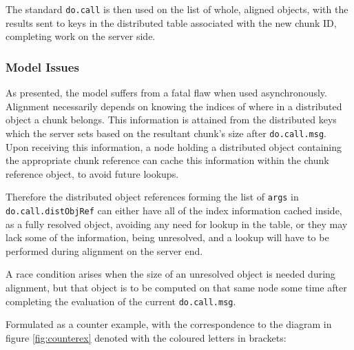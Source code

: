 The standard \texttt{do.call} is then used on the list of whole,
aligned objects, with the results sent to keys in the distributed table
associated with the new chunk ID, completing work on the server side.

\subsubsection{Model Issues}

As presented, the model suffers from a fatal flaw when used asynchronously.
Alignment necessarily depends on knowing the indices of where in a distributed
object a chunk belongs.
This information is attained from the distributed keys which the server sets
based on the resultant chunk's size after \texttt{do.call.msg}.
Upon receiving this information, a node holding a distributed object containing
the appropriate chunk reference can cache this information within the chunk
reference object, to avoid future lookups.

Therefore the distributed object references forming the list of \texttt{args}
in \texttt{do.call.distObjRef} can either have all of the index
information cached inside, as a fully resolved object, avoiding any need for
lookup in the table, or they may lack some of the information, being
unresolved, and a lookup will have to be performed during alignment on the
server end.

A race condition arises when the size of an unresolved object is needed during
alignment, but that object is to be computed on that same node some time after
completing the evaluation of the current \texttt{do.call.msg}. 


Formulated as a counter example, with the correspondence to the diagram in
figure \cref{fig:counterex} denoted with the coloured letters in brackets:

